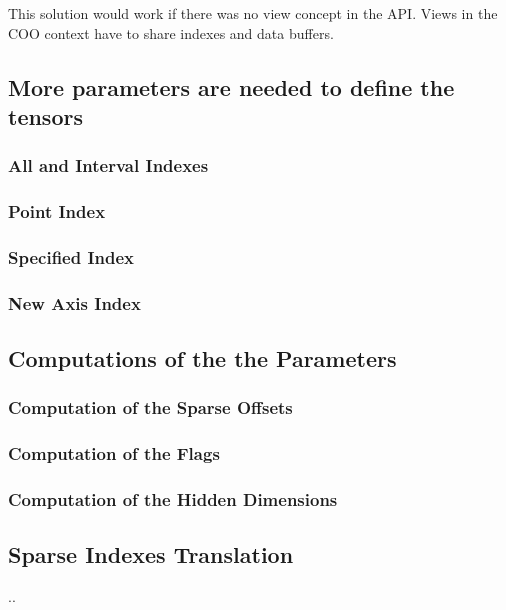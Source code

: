 
This solution would work if there was no view concept in the API. Views in the COO context have to share indexes and data buffers. 

\subsection{More parameters are needed to define the tensors}


\subsubsection{All and Interval Indexes}
\subsubsection{Point Index}
\subsubsection{Specified Index}
\subsubsection{New Axis Index}

\subsection{Computations of the the Parameters}
\subsubsection{Computation of the Sparse Offsets}
\subsubsection{Computation of the Flags}
\subsubsection{Computation of the Hidden Dimensions}

\subsection{Sparse Indexes Translation}
..